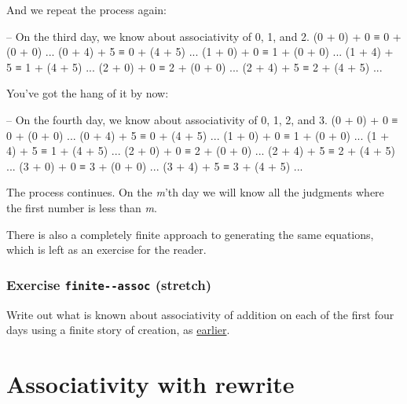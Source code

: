 And we repeat the process again:

\begin{myDisplay}
-- On the third day, we know about associativity of 0, 1, and 2.
(0 + 0) + 0 ≡ 0 + (0 + 0)   ...   (0 + 4) + 5 ≡ 0 + (4 + 5)   ...
(1 + 0) + 0 ≡ 1 + (0 + 0)   ...   (1 + 4) + 5 ≡ 1 + (4 + 5)   ...
(2 + 0) + 0 ≡ 2 + (0 + 0)   ...   (2 + 4) + 5 ≡ 2 + (4 + 5)   ...
\end{myDisplay}

You've got the hang of it by now:

\begin{myDisplay}
-- On the fourth day, we know about associativity of 0, 1, 2, and 3.
(0 + 0) + 0 ≡ 0 + (0 + 0)   ...   (0 + 4) + 5 ≡ 0 + (4 + 5)   ...
(1 + 0) + 0 ≡ 1 + (0 + 0)   ...   (1 + 4) + 5 ≡ 1 + (4 + 5)   ...
(2 + 0) + 0 ≡ 2 + (0 + 0)   ...   (2 + 4) + 5 ≡ 2 + (4 + 5)   ...
(3 + 0) + 0 ≡ 3 + (0 + 0)   ...   (3 + 4) + 5 ≡ 3 + (4 + 5)   ...
\end{myDisplay}

The process continues. On the \emph{m}'th day we will know all the
judgments where the first number is less than \emph{m}.

There is also a completely finite approach to generating the same
equations, which is left as an exercise for the reader.

\hypertarget{Induction-finite-plus-assoc}{%
\subsubsection{\texorpdfstring{Exercise \texttt{finite-\textbar{}-assoc}
(stretch)}{Exercise finite-\textbar-assoc (stretch)}}\label{Induction-finite-plus-assoc}}

Write out what is known about associativity of addition on each of the
first four days using a finite story of creation, as
\protect\hyperlink{Naturals-finite-creation}{earlier}.

\begin{fence}
\begin{code}%
\>[0]\<%
\end{code}
\end{fence}

\hypertarget{associativity-with-rewrite}{%
\section{Associativity with rewrite}\label{associativity-with-rewrite}}

